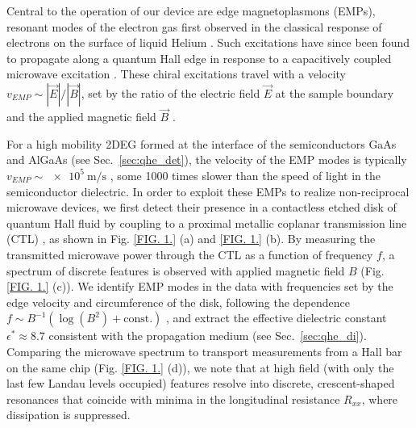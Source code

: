 Central to the operation of our device are edge magnetoplasmons (EMPs), resonant modes of the electron gas first observed in the classical response of electrons on the surface of liquid Helium \cite{PhysRevLett.54.1706, glattli1985dynamical}. Such excitations have since been found to propagate along a quantum Hall edge in response to a capacitively coupled microwave excitation \cite{1988ZhETF..94..217V, andrei1988low, talyanskii1990edge, ashoori1992edge,zhitenev1994experimental, kumada2013plasmon, petkovic2013carrier, kumada2014resonant}. These chiral excitations travel with a velocity $v_{EMP}\sim|\vec{E}|/|\vec{B}|$,  set by the ratio of the electric field $\vec{E}$ at the sample boundary and the applied magnetic field $\vec{B}$ \cite{talyanskii1990edge}.

For a high mobility 2DEG formed at the interface of the semiconductors GaAs and AlGaAs (see Sec.~\ref{sec:qhe_det}), the velocity of the EMP modes is typically $v_{EMP}\sim \SI{e5}{\meter\per\second}$ \cite{kumada2011edge, kamata2010voltage}, some 1000 times slower than the speed of light in the semiconductor dielectric. In order to exploit these EMPs to realize non-reciprocal microwave devices, we first detect their presence in a contactless etched disk of quantum Hall fluid by coupling to a proximal metallic coplanar transmission line (CTL) \cite{cano2013microwave}, as shown in Fig. \ref{FIG. 1.} (a) and \ref{FIG. 1.} (b). By measuring the transmitted microwave power through the CTL as a function of frequency $f$, a spectrum of discrete features is observed with applied magnetic field $B$ (Fig. \ref{FIG. 1.} (c)). We identify EMP modes in the data with frequencies set by the edge velocity and circumference of the disk, following the dependence $f\sim B^{-1}(\log(B^2) + \textrm{const.})$ \cite{1988ZhETF..94..217V}, and extract the effective dielectric constant $\epsilon^* \approx 8.7$ consistent with the propagation medium \cite{ashoori1992edge,balaban1997observation} (see Sec.~\ref{sec:qhe_di}). Comparing the microwave spectrum to transport measurements from a Hall bar on the same chip (Fig. \ref{FIG. 1.} (d)), we note that at high field (with only the last few Landau levels occupied) features resolve into discrete, crescent-shaped resonances that coincide with minima in the longitudinal resistance $R_{xx}$, where dissipation is suppressed.

